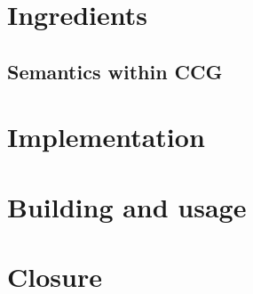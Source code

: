 \maketitle
\thispagestyle{empty}
\printtoc
\pagebreak


    
    

\pagebreak
\section{Ingredients}
    
    
    \subsection{Semantics within CCG}
        
        
        
    
    
\pagebreak
\section{Implementation}
    
    
    
    
    
\pagebreak
\section{Building and usage}
    
\pagebreak
\section{Closure}
    

\pagebreak
\begin{appendices} \appendix
    
    
    
\end{appendices}

\pagebreak
\printbibliography[heading=bibintoc,title={References}]
